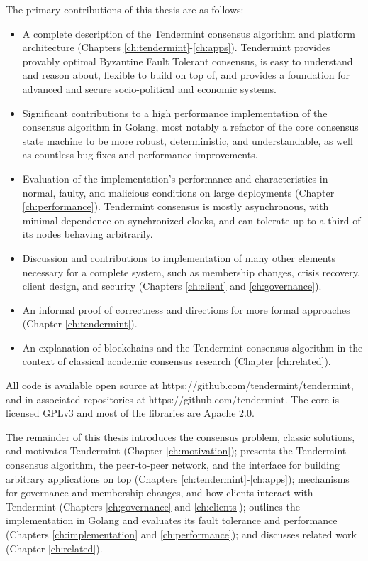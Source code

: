 The primary contributions of this thesis are as follows:


\begin{itemize}  

    \item A complete description of the Tendermint consensus algorithm and platform architecture (Chapters \ref{ch:tendermint}-\ref{ch:apps}). Tendermint provides provably optimal Byzantine Fault Tolerant consensus, is easy to understand and reason about, flexible to build on top of, and provides a foundation for advanced and secure socio-political and economic systems. 

    \item Significant contributions to a high performance implementation of the consensus algorithm in Golang, most notably a refactor of the core consensus state machine to be more robust, deterministic, and understandable, as well as countless bug fixes and performance improvements.

    \item Evaluation of the implementation's performance and characteristics in normal, faulty, and malicious conditions on large deployments (Chapter \ref{ch:performance}). Tendermint consensus is mostly asynchronous, with minimal dependence on synchronized clocks, and can tolerate up to a third of its nodes behaving arbitrarily. 

    \item Discussion and contributions to implementation of many other elements necessary for a complete system, such as membership changes, crisis recovery, client design, and security (Chapters \ref{ch:client} and \ref{ch:governance}).

    \item An informal proof of correctness and directions for more formal approaches (Chapter \ref{ch:tendermint}).

    \item An explanation of blockchains and the Tendermint consensus algorithm in the context of classical academic consensus research (Chapter \ref{ch:related}).
\end{itemize}

All code is available open source at https://github.com/tendermint/tendermint, and in associated repositories at https://github.com/tendermint. 
The core is licensed GPLv3 and most of the libraries are Apache 2.0.

The remainder of this thesis introduces the consensus problem, 
classic solutions, and motivates Tendermint (Chapter \ref{ch:motivation});
presents the Tendermint consensus algorithm, 
the peer-to-peer network, 
and the interface for building arbitrary applications on top 
(Chapters \ref{ch:tendermint}-\ref{ch:apps});
mechanisms for governance and membership changes, and how clients interact with Tendermint (Chapters \ref{ch:governance} and \ref{ch:clients});
outlines the implementation in Golang and evaluates its fault tolerance and performance (Chapters \ref{ch:implementation} and \ref{ch:performance});
and discusses related work (Chapter \ref{ch:related}).
